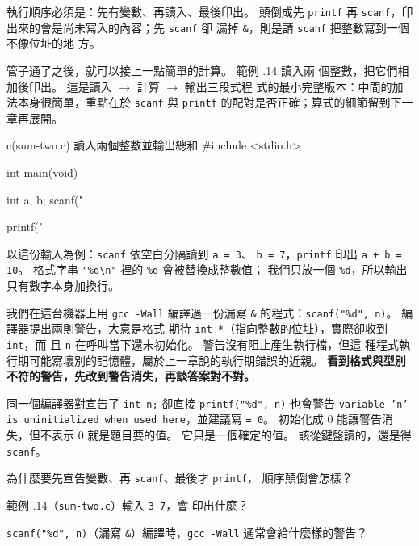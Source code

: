 
執行順序必須是：先有變數、再讀入、最後印出。 顛倒成先 \texttt{printf}
再 \texttt{scanf}，印出來的會是尚未寫入的內容；先 \texttt{scanf} 卻
漏掉 \texttt{\&}，則是請 \texttt{scanf} 把整數寫到一個不像位址的地
方。

管子通了之後，就可以接上一點簡單的計算。 範例 \thechapter.14 讀入兩
個整數，把它們相加後印出。 這是讀入 $\to$ 計算 $\to$ 輸出三段式程
式的最小完整版本：中間的加法本身很簡單，重點在於 \texttt{scanf} 與
\texttt{printf} 的配對是否正確；算式的細節留到下一章再展開。

\begin{example}{c}{(sum-two.c) 讀入兩個整數並輸出總和}
#include <stdio.h>

int main(void) {
    int a, b;
    scanf("%

    printf("%
}
\end{example}


以這份輸入為例：\texttt{scanf} 依空白分隔讀到 \texttt{a = 3}、
\texttt{b = 7}，\texttt{printf} 印出 \texttt{a + b = 10}。 格式字串
\texttt{"\%d\textbackslash n"} 裡的 \texttt{\%d} 會被替換成整數值；
我們只放一個 \texttt{\%d}，所以輸出只有數字本身加換行。

我們在這台機器上用 \texttt{gcc -Wall} 編譯過一份漏寫 \texttt{\&}
的程式：\texttt{scanf("\%d", n)}。 編譯器提出兩則警告，大意是格式
期待 \texttt{int *}（指向整數的位址），實際卻收到 \texttt{int}，而
且 \texttt{n} 在呼叫當下還未初始化。 警告沒有阻止產生執行檔，但這
種程式執行期可能寫壞別的記憶體，屬於上一章說的執行期錯誤的近親。
\textbf{看到格式與型別不符的警告，先改到警告消失，再談答案對不對。}

同一個編譯器對宣告了 \texttt{int n;} 卻直接 \texttt{printf("\%d",
n)} 也會警告 \texttt{variable 'n' is uninitialized when used
here}，並建議寫 \texttt{= 0}。 初始化成 $0$ 能讓警告消失，但不表示
$0$ 就是題目要的值。 它只是一個確定的值。 該從鍵盤讀的，還是得
\texttt{scanf}。


\begin{drills}[label=drills:basic-echo]
\item 為什麼要先宣告變數、再 \texttt{scanf}、最後才 \texttt{printf}，
順序顛倒會怎樣？
\item 範例 \thechapter.14（\texttt{sum-two.c}）輸入 \texttt{3 7}，會
印出什麼？
\item \texttt{scanf("\%d", n)}（漏寫 \texttt{\&}）編譯時，\texttt{gcc
-Wall} 通常會給什麼樣的警告？
\end{drills}

